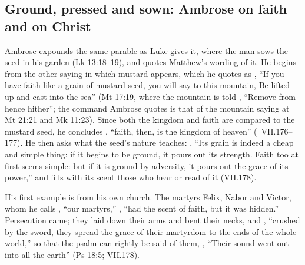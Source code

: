 \subsection{Ground, pressed and sown: Ambrose on faith and on Christ}
\label{sec:seed-ambrose}

Ambrose expounds the same parable as Luke gives it, where the man sows the
seed in his garden (Lk 13:18--19), and quotes Matthew's wording of it. He
begins from the other saying in which mustard appears, which he quotes as
, ``If you have faith like a grain of mustard seed, you
will say to this mountain, Be lifted up and cast into the sea'' (Mt 17:19, where
the mountain is told , ``Remove from hence hither'';
the command Ambrose quotes is that of the mountain saying at Mt 21:21 and
Mk 11:23). Since both the kingdom and faith are compared to the mustard seed,
he concludes , ``faith, then, is the
kingdom of heaven'' (~VII.176--177). He then asks
what the seed's nature teaches: , ``Its grain is
indeed a cheap and simple thing: if it begins to be ground, it pours out its
strength. Faith too at first seems simple: but if it is ground by adversity,
it pours out the grace of its power,'' and fills with its scent those who hear
or read of it (VII.178).

His first example is from his own church. The martyrs Felix, Nabor and
Victor, whom he calls , ``our martyrs,''
, ``had the scent of faith, but it
was hidden.'' Persecution came; they laid down their arms and bent their
necks, and , ``crushed by the sword, they spread the grace of their
martyrdom to the ends of the whole world,'' so that the psalm can rightly be
said of them, , ``Their sound went
out into all the earth'' (Ps 18:5; VII.178).

